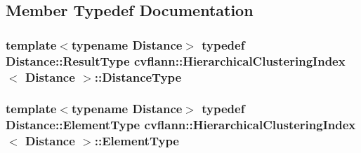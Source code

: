 \subsection{Member Typedef Documentation}
\hypertarget{classcvflann_1_1HierarchicalClusteringIndex_af8e155c4fe99eaf41a492fddfcb87fcf}{
\subsubsection[{Distance\-Type}]{\setlength{\rightskip}{0pt plus 5cm}template$<$typename Distance$>$ typedef Distance\-::\-Result\-Type {\bf cvflann\-::\-Hierarchical\-Clustering\-Index}$<$ Distance $>$\-::{\bf Distance\-Type}}}\label{classcvflann_1_1HierarchicalClusteringIndex_af8e155c4fe99eaf41a492fddfcb87fcf}
\hypertarget{classcvflann_1_1HierarchicalClusteringIndex_a8b00f29310310cb2b1ebf3bfc61ec2ed}{
\subsubsection[{Element\-Type}]{\setlength{\rightskip}{0pt plus 5cm}template$<$typename Distance$>$ typedef Distance\-::\-Element\-Type {\bf cvflann\-::\-Hierarchical\-Clustering\-Index}$<$ Distance $>$\-::{\bf Element\-Type}}}\label{classcvflann_1_1HierarchicalClusteringIndex_a8b00f29310310cb2b1ebf3bfc61ec2ed}


